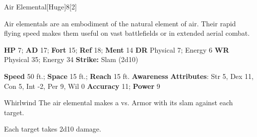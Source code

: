   \begin{monsection}{Air Elemental}[Huge]{8}[2]
    \vspace{-1em}\vspace{-1em}
    \vspace{0em}

    
    Air elementals are an embodiment of the natural element of air.
    Their rapid flying speed makes them useful on vast battlefields or in extended aerial combat.
  

    \begin{spellcontent}
      \begin{spelltargetinginfo}
        \pari \textbf{HP} 7;
          \textbf{AD} 17;
          \textbf{Fort} 15;
          \textbf{Ref} 18;
          \textbf{Ment} 14
        \pari \textbf{DR} Physical 7; Energy 6
        \pari \textbf{WR} Physical 35; Energy 34
        \pari \textbf{Strike:}
            Slam  (2d10)
      \end{spelltargetinginfo}
    \end{spellcontent}
    \begin{monsterfooter}
      \pari \textbf{Speed} 50 ft.;
        \textbf{Space} 15 ft.;
        \textbf{Reach} 15 ft.
      \pari \textbf{Awareness} 
      \pari \textbf{Attributes}:
        Str 5, Dex 11,
        Con 5, Int -2,
        Per 9, Wil 0
      \pari \textbf{Accuracy} 11;
        \textbf{Power} 9
    \end{monsterfooter}
  \end{monsection}
  \begin{freeability}{Whirlwind}
      The air elemental makes a 
         vs. Armor
        with its slam against each target.
    
    \hit Each target takes 2d10  damage.
    \end{freeability}
  
